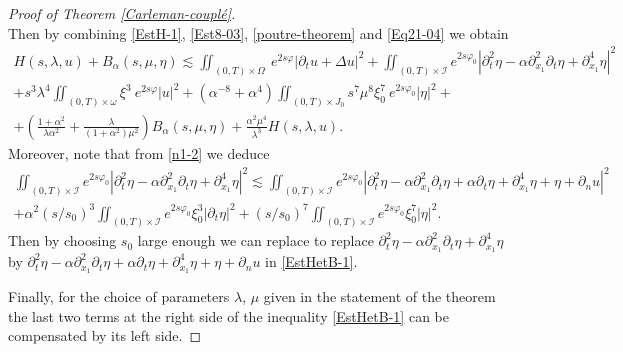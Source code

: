 \documentclass[a4paper, 12pt]{article}
\theoremstyle{plain}
\theoremstyle{definition}
\numberwithin{theorem}{section}
\numberwithin{equation}{section}
\begin{document}
{\begin{proof}[Proof of Theorem \ref{Carleman-couplé}]
\begin{equation}
\end{equation}
Then by combining \eqref{EstH-1}, \eqref{Est8-03}, \eqref{poutre-theorem}  and \eqref{Eq21-04}  we obtain
\begin{multline}\label{EstHetB-1}
H(s, \lambda, u) +B_\alpha (s, \mu, \eta) \lesssim
   \iint_{(0,T)\times\Omega}~e^{2s\varphi}|\partial_tu+\Delta u|^2+\iint_{(0,T)\times\mathcal{I}}e^{2s\varphi_0}|\partial^2_t\eta-\alpha\partial^2_{x_1}\partial_t\eta+\partial^4_{x_1}\eta|^2 \\
   +s^3\lambda^4\iint_{(0,T)\times\omega} \xi^3~e^{2s\varphi}| u|^2+ \left(\alpha^{-8}+\alpha^4\right)\iint_{(0,T)\times J_0}s^7\mu^8\xi^7_0~e^{2s\varphi_0}|\eta|^2+\\ 
   +\left(\frac{1+\alpha^2}{\lambda \alpha^2}+\frac{\lambda}{(1+\alpha^2)\mu^2}\right) B_\alpha(s, \mu, \eta)+\frac{\alpha^2\mu^4}{\lambda^3}H(s, \lambda, u).
\end{multline}
Moreover, note that from \eqref{n1-2} we deduce
\begin{multline*}
\iint_{(0,T)\times\mathcal{I}}e^{2s\varphi_0}|\partial^2_t\eta-\alpha\partial^2_{x_1}\partial_t\eta+\partial^4_{x_1}\eta|^2\lesssim \iint_{(0,T)\times\mathcal{I}}e^{2s\varphi_0}|\partial^2_t\eta-\alpha\partial^2_{x_1}\partial_t\eta+\alpha\partial_t\eta+\partial^4_{x_1}\eta+\eta+\partial_nu|^2\\+\alpha^2(s/s_0)^3\iint_{(0,T)\times\mathcal{I}}e^{2s\varphi_0}\xi_0^3 |\partial_t\eta|^2+(s/s_0)^7\iint_{(0,T)\times\mathcal{I}}e^{2s\varphi_0}\xi_0^7 |\eta|^2.
\end{multline*}
Then by choosing $s_0$ large enough we can replace  to replace $\partial^2_t\eta-\alpha\partial^2_{x_1}\partial_t\eta+\partial^4_{x_1}\eta$ by $\partial^2_t\eta-\alpha\partial^2_{x_1}\partial_t\eta+\alpha\partial_t\eta+\partial^4_{x_1}\eta+\eta+\partial_nu$ in \eqref{EstHetB-1}. 

Finally, for the choice of parameters $\lambda$, $\mu$ given in the statement of the theorem the last two terms at the right side of the inequality \eqref{EstHetB-1} can be compensated by its left side.
\end{proof}


}
\end{document}
